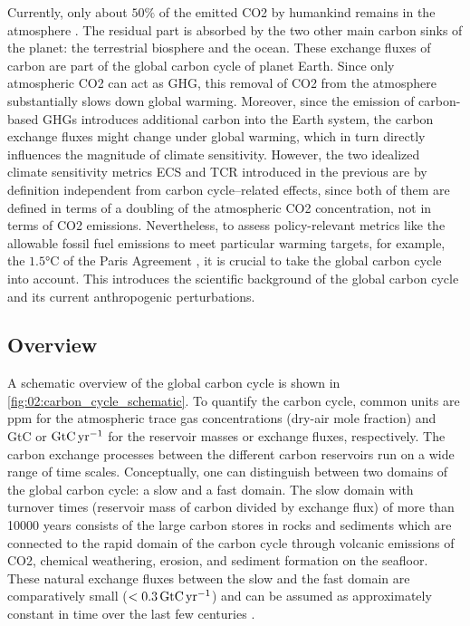 Currently, only about $50 \unit{\%}$ of the emitted \ac{CO2} by humankind
remains in the atmosphere \autocite{Friedlingstein2020}. The residual part is
absorbed by the two other main carbon sinks of the planet: the terrestrial
biosphere and the ocean. These exchange fluxes of carbon are part of the global
carbon cycle of planet Earth. Since only atmospheric \ac{CO2} can act as
\ac{GHG}, this removal of \ac{CO2} from the atmosphere substantially slows down
global warming. Moreover, since the emission of carbon-based \acp{GHG}
introduces additional carbon into the Earth system, the carbon exchange fluxes
might change under global warming, which in turn directly influences the
magnitude of climate sensitivity. However, the two idealized climate
sensitivity metrics \ac{ECS} and \ac{TCR} introduced in the previous
 are by definition independent from
carbon cycle--related effects, since both of them are defined in terms of a
doubling of the atmospheric \ac{CO2} concentration, not in terms of \ac{CO2}
emissions. Nevertheless, to assess policy-relevant metrics like the allowable
fossil fuel emissions to meet particular warming targets, for example, the $1.5
\unit{\degreeCelsius}$ of the Paris Agreement \autocite{UNFCCC2015}, it is
crucial to take the global carbon cycle into account. This
 introduces the scientific background of the
global carbon cycle and its current anthropogenic perturbations.


\subsection{Overview}
\label{subsec:02:carbon_cycle_overview}

A schematic overview of the global carbon cycle is shown in
\cref{fig:02:carbon_cycle_schematic}. To quantify the carbon cycle, common
units are \ac{ppm} for the atmospheric trace gas concentrations (dry-air mole
fraction) and \ac{GtC} or $\si{\GtCyr{}}$ for the reservoir masses or exchange
fluxes, respectively. The carbon exchange processes between the different
carbon reservoirs run on a wide range of time scales. Conceptually, one can
distinguish between two domains of the global carbon cycle: a slow and a fast
domain. The slow domain with turnover times (reservoir mass of carbon divided
by exchange flux) of more than 10000 years consists of the large carbon stores
in rocks and sediments which are connected to the rapid domain of the carbon
cycle through volcanic emissions of \ac{CO2}, chemical weathering, erosion, and
sediment formation on the seafloor. These natural exchange fluxes between the
slow and the fast domain are comparatively small ($< 0.3 \unit{\GtCyr{}}$) and
can be assumed as approximately constant in time over the last few centuries
\autocite{Ciais2013}.

